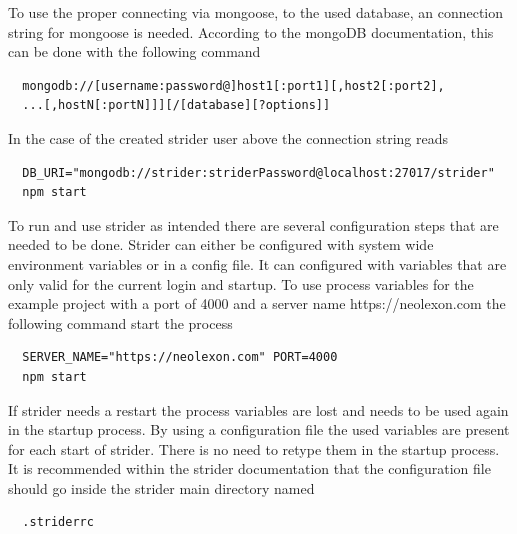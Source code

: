 To use the proper connecting via mongoose, to the used database, an connection string for mongoose is needed. According to the mongoDB
documentation, this can be done with the following command
\begin{lstlisting}
  mongodb://[username:password@]host1[:port1][,host2[:port2],
  ...[,hostN[:portN]]][/[database][?options]]
\end{lstlisting}
In the case of the created strider user above the connection string reads
\begin{lstlisting}
  DB_URI="mongodb://strider:striderPassword@localhost:27017/strider"
  npm start
\end{lstlisting}

To run and use strider as intended there are several configuration steps that are needed to be done. Strider can either be configured
with system wide environment variables or in a config file. It can configured with variables that are only valid for the current login and
startup. To use process variables for the example project with a port of 4000 and a server name https://neolexon.com the following
command start the process

\begin{lstlisting}
  SERVER_NAME="https://neolexon.com" PORT=4000
  npm start
\end{lstlisting}

If strider needs a restart the process variables are lost and needs to be used again in the startup process. By using a configuration file
the used variables are present for each start of strider. There is no need to retype them in the startup process. It is recommended within
the strider documentation that the configuration file should go inside the strider main directory named

\begin{lstlisting}
  .striderrc
\end{lstlisting}

